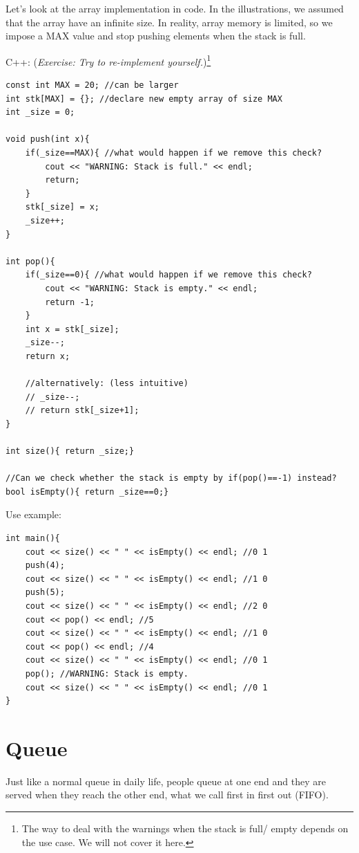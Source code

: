 Let's look at the array implementation in code. In the illustrations, we assumed that the array have an infinite size. In reality, array memory is limited, so we impose a MAX value and stop pushing elements when the stack is full.
\vspace{6mm}

C++: (\textit{Exercise: Try to re-implement yourself.})\footnote{The way to deal with the warnings when the stack is full/ empty depends on the use case. We will not cover it here.}
\begin{lstlisting}
const int MAX = 20; //can be larger
int stk[MAX] = {}; //declare new empty array of size MAX
int _size = 0;

void push(int x){
    if(_size==MAX){ //what would happen if we remove this check?
        cout << "WARNING: Stack is full." << endl;
        return;
    }
    stk[_size] = x;
    _size++;
}

int pop(){
    if(_size==0){ //what would happen if we remove this check?
        cout << "WARNING: Stack is empty." << endl;
        return -1;
    }
    int x = stk[_size];
    _size--;
    return x;

    //alternatively: (less intuitive)
    // _size--;
    // return stk[_size+1];
}

int size(){ return _size;}

//Can we check whether the stack is empty by if(pop()==-1) instead?
bool isEmpty(){ return _size==0;}
\end{lstlisting}

Use example:
\begin{lstlisting}
int main(){
    cout << size() << " " << isEmpty() << endl; //0 1
    push(4);
    cout << size() << " " << isEmpty() << endl; //1 0
    push(5);
    cout << size() << " " << isEmpty() << endl; //2 0
    cout << pop() << endl; //5
    cout << size() << " " << isEmpty() << endl; //1 0
    cout << pop() << endl; //4
    cout << size() << " " << isEmpty() << endl; //0 1
    pop(); //WARNING: Stack is empty.
    cout << size() << " " << isEmpty() << endl; //0 1
} 
\end{lstlisting}
\section{Queue}
Just like a normal queue in daily life, people queue at one end and they are served when they reach the other end, what we call first in first out (FIFO).

